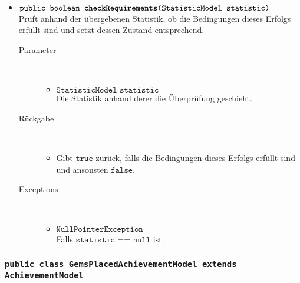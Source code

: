 \begin{description}
\begin{itemize}
		\item $\texttt{public boolean \textbf{checkRequirements}(StatisticModel statistic)}$ \\ Prüft anhand der übergebenen Statistik, ob die Bedingungen dieses Erfolgs erfüllt sind und setzt dessen Zustand entsprechend.
		\begin{description}
		\item[Parameter] \hfill \\
			\vspace{-.8cm}
			\begin{itemize}
				\item $\texttt{StatisticModel statistic}$ \\ Die Statistik anhand derer die Überprüfung geschieht. 
			\end{itemize}
			\item[Rückgabe] \hfill \\
			\vspace{-.8cm}
			\begin{itemize}
				\item Gibt $\texttt{true}$ zurück, falls die Bedingungen dieses Erfolgs erfüllt sind und ansonsten $\texttt{false}$.
			\end{itemize}
			\item[Exceptions] \hfill \\
			\vspace{-.8cm}
			\begin{itemize}
				\item $\texttt{NullPointerException}$ \\ Falls $\texttt{statistic == null}$ ist.
			\end{itemize}
		\end{description}
		
	\end{itemize}
\end{description}

\subsubsection{\normalfont \texttt{public class \textbf{GemsPlacedAchievementModel} extends AchievementModel}}

